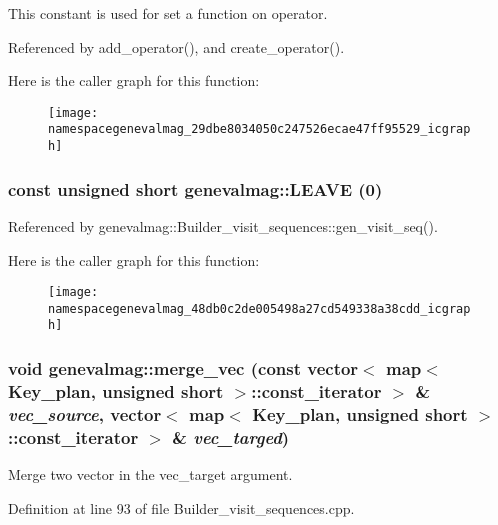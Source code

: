 This constant is used for set a function on operator. 

Referenced by add\_\-operator(), and create\_\-operator().

Here is the caller graph for this function:\nopagebreak
\begin{figure}[H]
\begin{center}
\leavevmode
\texttt{[image: namespacegenevalmag\_29dbe8034050c247526ecae47ff95529\_icgraph]}
\end{center}
\end{figure}
\hypertarget{namespacegenevalmag_48db0c2de005498a27cd549338a38cdd}{
\subsubsection[{LEAVE}]{\setlength{\rightskip}{0pt plus 5cm}const unsigned short genevalmag::LEAVE (0)}}
\label{namespacegenevalmag_48db0c2de005498a27cd549338a38cdd}




Referenced by genevalmag::Builder\_\-visit\_\-sequences::gen\_\-visit\_\-seq().

Here is the caller graph for this function:\nopagebreak
\begin{figure}[H]
\begin{center}
\leavevmode
\texttt{[image: namespacegenevalmag\_48db0c2de005498a27cd549338a38cdd\_icgraph]}
\end{center}
\end{figure}
\hypertarget{namespacegenevalmag_3d48cfd13c4608c5235a6968c63855da}{
\subsubsection[{merge\_\-vec}]{\setlength{\rightskip}{0pt plus 5cm}void genevalmag::merge\_\-vec (const vector$<$ map$<$ {\bf Key\_\-plan}, unsigned short $>$::const\_\-iterator $>$ \& {\em vec\_\-source}, \/  vector$<$ map$<$ {\bf Key\_\-plan}, unsigned short $>$::const\_\-iterator $>$ \& {\em vec\_\-targed})}}
\label{namespacegenevalmag_3d48cfd13c4608c5235a6968c63855da}


Merge two vector in the vec\_\-target argument. 

Definition at line 93 of file Builder\_\-visit\_\-sequences.cpp.

